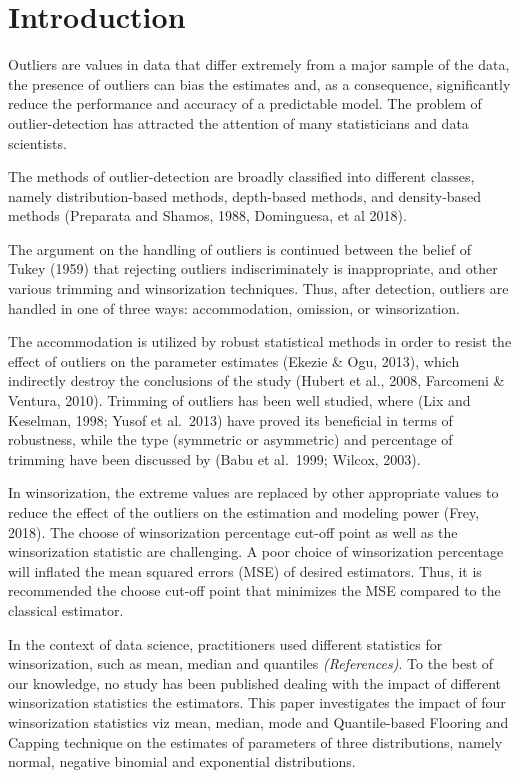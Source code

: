 \documentclass[notitlepage,12pt]{jedm}
\begin{document}
\hypertarget{introduction-1}{%
\section{Introduction}\label{introduction-1}}

Outliers are values in data that differ extremely from a major sample of
the data, the presence of outliers can bias the estimates and, as a
consequence, significantly reduce the performance and accuracy of a
predictable model. The problem of outlier-detection has attracted the
attention of many statisticians and data scientists.

The methods of outlier-detection are broadly classified into different
classes, namely distribution-based methods, depth-based methods, and
density-based methods (Preparata and Shamos, 1988, Dominguesa, et al
2018).

The argument on the handling of outliers is continued between the belief
of Tukey (1959) that rejecting outliers indiscriminately is
inappropriate, and other various trimming and winsorization techniques.
Thus, after detection, outliers are handled in one of three ways:
accommodation, omission, or winsorization.

The accommodation is utilized by robust statistical methods in order to
resist the effect of outliers on the parameter estimates (Ekezie \& Ogu,
2013), which indirectly destroy the conclusions of the study (Hubert et
al., 2008, Farcomeni \& Ventura, 2010). Trimming of outliers has been
well studied, where (Lix and Keselman, 1998; Yusof et al.~2013) have
proved its beneficial in terms of robustness, while the type (symmetric
or asymmetric) and percentage of trimming have been discussed by (Babu
et al.~1999; Wilcox, 2003).

In winsorization, the extreme values are replaced by other appropriate
values to reduce the effect of the outliers on the estimation and
modeling power (Frey, 2018). The choose of winsorization percentage
cut-off point as well as the winsorization statistic are challenging. A
poor choice of winsorization percentage will inflated the mean squared
errors (MSE) of desired estimators. Thus, it is recommended the choose
cut-off point that minimizes the MSE compared to the classical
estimator.

In the context of data science, practitioners used different statistics
for winsorization, such as mean, median and quantiles
\emph{(References)}. To the best of our knowledge, no study has been
published dealing with the impact of different winsorization statistics
the estimators. This paper investigates the impact of four winsorization
statistics viz mean, median, mode and Quantile-based Flooring and
Capping technique on the estimates of parameters of three distributions,
namely normal, negative binomial and exponential distributions.
\end{document}
